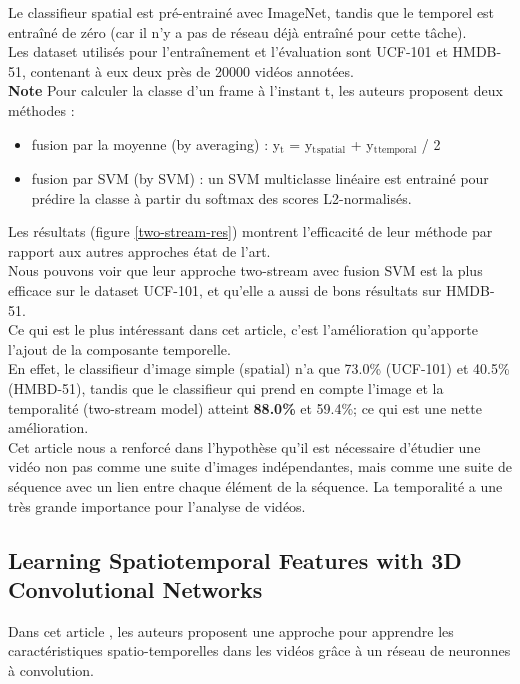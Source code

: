 \documentclass[11pt]{article}
\begin{document}
Le classifieur spatial est pré-entrainé avec ImageNet, tandis que le temporel est entraîné de zéro (car il n'y a pas de réseau déjà entraîné pour cette tâche).\\
Les dataset utilisés pour l'entraînement et l'évaluation sont UCF-101 et HMDB-51, contenant à eux deux près de 20000 vidéos annotées.\\

\textbf{Note} Pour calculer la classe d'un frame à l'instant t, les auteurs proposent deux méthodes :\\
\begin{itemize}
\item fusion par la moyenne (by averaging) : y\(_{\text{t}}\) = y\(_{\text{t}}\)\(_{\text{spatial}}\) + y\(_{\text{t}}\)\(_{\text{temporal}}\) / 2\\
\item fusion par SVM (by SVM) : un SVM multiclasse linéaire est entrainé pour prédire la classe à partir du softmax des scores L2-normalisés.\\
\end{itemize}

Les résultats (figure \ref{two-stream-res}) montrent l'efficacité de leur méthode par rapport aux autres approches état de l'art.\\

Nous pouvons voir que leur approche two-stream avec fusion SVM est la plus efficace sur le dataset UCF-101, et qu'elle a aussi de bons résultats sur HMDB-51.\\

Ce qui est le plus intéressant dans cet article, c'est l'amélioration qu'apporte l'ajout de la composante temporelle.\\
En effet, le classifieur d'image simple (spatial) n'a que 73.0\% (UCF-101) et 40.5\% (HMBD-51), tandis que le classifieur qui prend en compte l'image et la temporalité (two-stream model) atteint \textbf{88.0\%} et 59.4\%; ce qui est une nette amélioration.\\

Cet article nous a renforcé dans l'hypothèse qu'il est nécessaire d'étudier une vidéo non pas comme une suite d'images indépendantes, mais comme une suite de séquence avec un lien entre chaque élément de la séquence. La temporalité a une très grande importance pour l'analyse de vidéos.\\

\subsection{Learning Spatiotemporal Features with 3D Convolutional Networks}
\label{sec:org7319d4e}
Dans cet article \cite{Tran_2015}, les auteurs proposent une approche pour apprendre les caractéristiques spatio-temporelles dans les vidéos grâce à un réseau de neuronnes à convolution.\\
\end{document}
